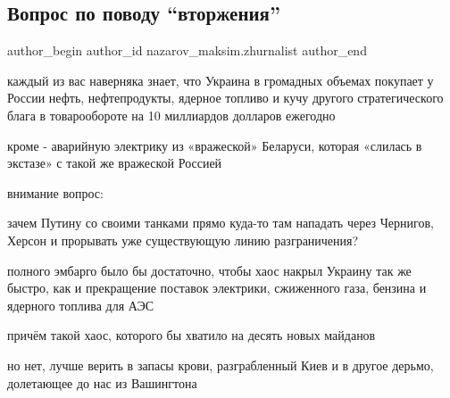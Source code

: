  
 
 
 
 
 
\subsection{Вопрос по поводу \enquote{вторжения}}
\label{sec:29_01_2022.fb.nazarov_maksim.zhurnalist.1.vopros_vtorzhenie}
 
\ifcmt
 author_begin
   author_id nazarov_maksim.zhurnalist
 author_end
\fi

каждый из вас наверняка знает, что Украина в громадных объемах покупает у
России нефть, нефтепродукты, ядерное топливо и кучу другого стратегического
блага в товарообороте на 10 миллиардов долларов ежегодно 

кроме - аварийную электрику из «вражеской» Беларуси, которая «слилась в
экстазе» с такой же вражеской Россией 

внимание вопрос:

зачем Путину со своими танками прямо куда-то там нападать через Чернигов,
Херсон и прорывать уже существующую линию разграничения?

полного эмбарго было бы достаточно, чтобы хаос накрыл Украину так же быстро,
как и прекращение поставок электрики, сжиженного газа, бензина и ядерного
топлива для АЭС 

причём такой хаос, которого бы хватило на десять новых майданов

но нет, лучше верить в запасы крови, разграбленный Киев и в другое дерьмо,
долетающее до нас из Вашингтона
